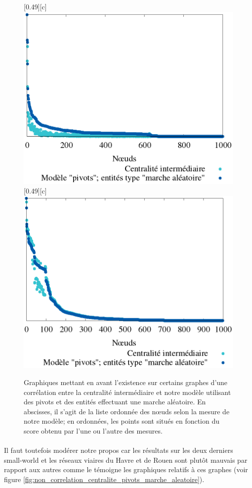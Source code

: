 \documentclass[a4paper, 10pt]{report}
\begin{document}
\begin{figure}[htbp]
{	}
	\hfill
	[0.49\linewidth][c]{
		\includegraphics[width=0.49\linewidth]{./img/pivots_marche_aleatoire_preferential_attachement_1000_2.png}
	}
	\hfill
	[0.49\linewidth][c]{
		\includegraphics[width=0.49\linewidth]{./img/pivots_marche_aleatoire_small_world_1000_2_0_5.png}
	}
	\caption{Graphiques mettant en avant l'existence sur certains graphes d'une corrélation entre la centralité intermédiaire et notre modèle utilisant des pivots et des entités effectuant une marche aléatoire. En abscisses, il s'agit de la liste ordonnée des n\oe uds selon la mesure de notre modèle; en ordonnées, les points sont situés en fonction du score obtenu par l'une ou l'autre des mesures.}
	\label{fig:correlation_centralite_pivots_marche_aleatoire}
\end{figure}

\paragraph{}Il faut toutefois modérer notre propos car les résultats sur les deux derniers small-world et les réseaux viaires du Havre et de Rouen sont plutôt mauvais par rapport aux autres comme le témoigne les graphiques relatifs à ces graphes (voir figure \ref{fig:non_correlation_centralite_pivots_marche_aleatoire}).
\end{document}
